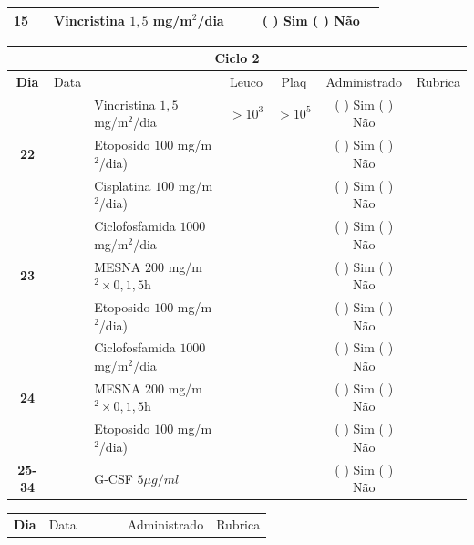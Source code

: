\documentclass[11pt,a4paper,oldfontcommands]{memoir}
\begin{document}
\begin{center}
\begin{table}[H]
\begin{tabular}{p{1cm}c|p{4cm}|p{2cm}p{2cm}|c|c}
    \hline
    \multicolumn{1}{c|}{\textbf{15}}&&{Vincristina \(1,5\) mg/m\(^2\)/dia}&\multicolumn{1}{c}{}&&{(  ) Sim (  ) Não}&\\
    \hline
\end{tabular}
\end{table}
\begin{table}[H] \small
\begin{tabular}{p{1cm}c|p{4.8cm}|p{1.5cm}p{1.5cm}|c|c}
	\hline
	\multicolumn{7}{c}{Ciclo 2} \\
	\hline
	\multicolumn{1}{c|}{\multirow{1}{*}{\textbf{Dia}}}&{Data}&{}&\multicolumn{1}{c|}{Leuco}&\multicolumn{1}{c|}{Plaq}&{Administrado}&{Rubrica} \\
    \hline
    \multicolumn{1}{c|}{\multirow{3}{*}{\textbf{22}}}&&{Vincristina \(1,5\) mg/m\(^2\)/dia}&\multicolumn{1}{c|}{\(>10^3\)}&\multicolumn{1}{c|}{\(>10^5\)}&{(  ) Sim (  ) Não}&\\
    \cline{4-5}
    \multicolumn{1}{c|}{}&&{Etoposido \(100\) mg/m\(^2\)/dia)}&&&{(  ) Sim (  ) Não}&\\
    \cline{4-5}
    \multicolumn{1}{c|}{}&\multirow{1}{*}{}&{Cisplatina \(100\) mg/m\(^2\)/dia)}&&&{(  ) Sim (  ) Não}&\\
    \hline
    \multicolumn{1}{c|}{\multirow{3}{*}{\textbf{23}}}&&{Ciclofosfamida \(1000\) mg/m\(^2\)/dia}&{}&&{(  ) Sim (  ) Não}&\\
    \multicolumn{1}{c|}{}&&{MESNA \(200\) mg/m\(^2 \times 0,1,5\)h}&&&{(  ) Sim (  ) Não}&\\
    \multicolumn{1}{c|}{}&&{Etoposido \(100\) mg/m\(^2\)/dia)}&&&{(  ) Sim (  ) Não}&\\
    \hline
    \multicolumn{1}{c|}{\multirow{3}{*}{\textbf{24}}}&&{Ciclofosfamida \(1000\) mg/m\(^2\)/dia}&{}&&{(  ) Sim (  ) Não}&\\
    \multicolumn{1}{c|}{}&&{MESNA \(200\) mg/m\(^2 \times 0,1,5\)h}&&&{(  ) Sim (  ) Não}&\\
    \multicolumn{1}{c|}{}&\multirow{1}{*}{}&{Etoposido \(100\) mg/m\(^2\)/dia)}&{}&&{(  ) Sim (  ) Não}&\\
    \hline
    \multicolumn{1}{c|}{\textbf{25-34}}&&{G-CSF \(5 \mu g/ml\) }&&&{(  ) Sim (  ) Não}&\\
    \hline
\end{tabular}
\end{table}
\begin{table}[H]
\begin{tabular}{p{1cm}c|p{4cm}|p{2cm}p{2cm}|c|c}
	\hline
	\multicolumn{1}{c|}{\multirow{1}{*}{\textbf{Dia}}}&{Data}&{}&{}&&{Administrado}&{Rubrica} \\

\end{tabular}
\end{table}
\end{center}
\end{document}
